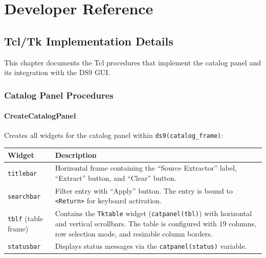 \documentclass[11pt,fleqn]{book}
\begin{document}
\part{Developer Reference}

\chapter{Tcl/Tk Implementation Details}
\label{ch:tcl}

This chapter documents the Tcl procedures that implement the catalog panel and its integration with the DS9 GUI.

\section{Catalog Panel Procedures}

\subsection{CreateCatalogPanel}

Creates all widgets for the catalog panel within \texttt{ds9(catalog\_frame)}:

\begin{center}
\begin{longtable}{L{3.5cm} L{9.5cm}}
\toprule
\textbf{Widget} & \textbf{Description} \\
\midrule
\endhead
\texttt{titlebar} & Horizontal frame containing the ``Source Extractor'' label, ``Extract'' button, and ``Clear'' button. \\
\midrule
\texttt{searchbar} & Filter entry with ``Apply'' button. The entry is bound to \texttt{<Return>} for keyboard activation. \\
\midrule
\texttt{tblf} (table frame) & Contains the \texttt{Tktable} widget (\texttt{catpanel(tbl)}) with horizontal and vertical scrollbars. The table is configured with 19 columns, row selection mode, and resizable column borders. \\
\midrule
\texttt{statusbar} & Displays status messages via the \texttt{catpanel(status)} variable. \\
\bottomrule
\end{longtable}
\end{center}
\end{document}
